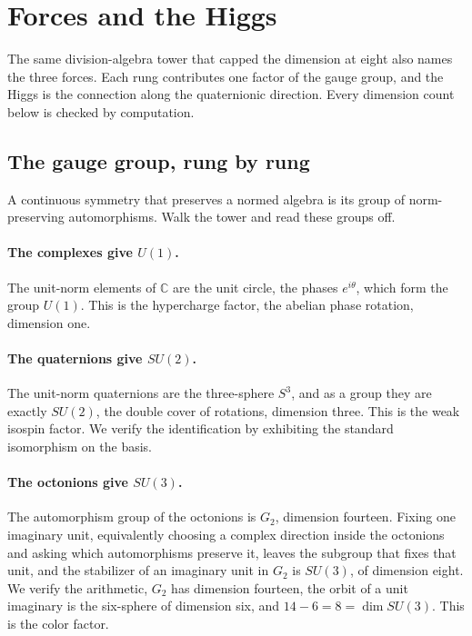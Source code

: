 \section{Forces and the Higgs} \label{sec:forces}

The same division-algebra tower that capped the dimension at eight also names the three forces. Each rung contributes
one factor of the gauge group, and the Higgs is the connection along the quaternionic direction. Every dimension count
below is checked by computation.

\subsection{The gauge group, rung by rung}

A continuous symmetry that preserves a normed algebra is its group of norm-preserving automorphisms. Walk the tower
and read these groups off.

\paragraph{The complexes give $U(1)$.} The unit-norm elements of $\mathbb{C}$ are the unit circle, the phases
$e^{i\theta}$, which form the group $U(1)$. This is the hypercharge factor, the abelian phase rotation, dimension one.

\paragraph{The quaternions give $SU(2)$.} The unit-norm quaternions are the three-sphere $S^3$, and as a group they
are exactly $SU(2)$, the double cover of rotations, dimension three. This is the weak isospin factor. We verify the
identification by exhibiting the standard isomorphism on the basis.

\paragraph{The octonions give $SU(3)$.} The automorphism group of the octonions is $G_2$, dimension fourteen. Fixing
one imaginary unit, equivalently choosing a complex direction inside the octonions and asking which automorphisms
preserve it, leaves the subgroup that fixes that unit, and the stabilizer of an imaginary unit in $G_2$ is $SU(3)$, of
dimension eight. We verify the arithmetic, $G_2$ has dimension fourteen, the orbit of a unit imaginary is the
six-sphere of dimension six, and $14 - 6 = 8 = \dim SU(3)$. This is the color factor.

